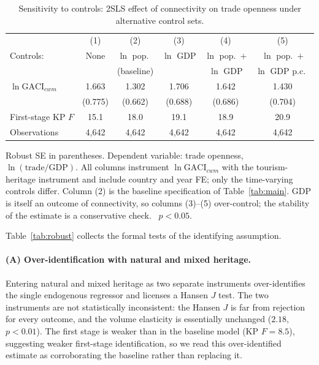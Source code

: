 \begin{table}[H]
\centering
\caption{Sensitivity to controls: 2SLS effect of connectivity on trade
openness under alternative control sets.}
\label{tab:controls}
\begin{threeparttable}
\small
\begin{tabular}{lccccc}
\toprule
 & (1) & (2) & (3) & (4) & (5) \\
Controls: & None & $\ln$ pop.\ & $\ln$ GDP & $\ln$ pop.\ $+$ & $\ln$ pop.\ $+$ \\
 & & (baseline) & & $\ln$ GDP & $\ln$ GDP p.c.\ \\
\midrule
$\ln\mathrm{GACI}_{cwm}$ & 1.663\sym{**} & 1.302\sym{**} & 1.706\sym{**} & 1.642\sym{**} & 1.430\sym{**} \\
 & (0.775) & (0.662) & (0.688) & (0.686) & (0.704) \\
\midrule
First-stage KP $F$ & 15.1 & 18.0 & 19.1 & 18.9 & 20.9 \\
Observations & 4{,}642 & 4{,}642 & 4{,}642 & 4{,}642 & 4{,}642 \\
\bottomrule
\end{tabular}
\begin{tablenotes}\small
\item Robust SE in parentheses. Dependent variable: trade openness,
$\ln(\text{trade}/\text{GDP})$. All columns instrument $\ln\mathrm{GACI}_{cwm}$
with the tourism-heritage instrument and include country and year FE; only the
time-varying controls differ. Column (2) is the baseline specification of
Table~\ref{tab:main}. GDP is itself an outcome of connectivity, so columns
(3)--(5) over-control; the stability of the estimate is a conservative check.
\sym{**}~$p<0.05$.
\end{tablenotes}
\end{threeparttable}
\end{table}

Table~\ref{tab:robust} collects the formal tests of the identifying assumption.

\paragraph{(A) Over-identification with natural and mixed heritage.} Entering
natural and mixed heritage as two separate instruments over-identifies
the single endogenous regressor and licenses a Hansen $J$ test. The two
instruments are not statistically inconsistent: the Hansen $J$ is far from
rejection for every outcome, and the volume
elasticity is essentially unchanged ($2.18$, $p<0.01$). The first stage is
weaker than in the baseline model (KP $F=8.5$), suggesting weaker first-stage
identification, so we read this over-identified estimate as corroborating the
baseline rather than replacing it.

